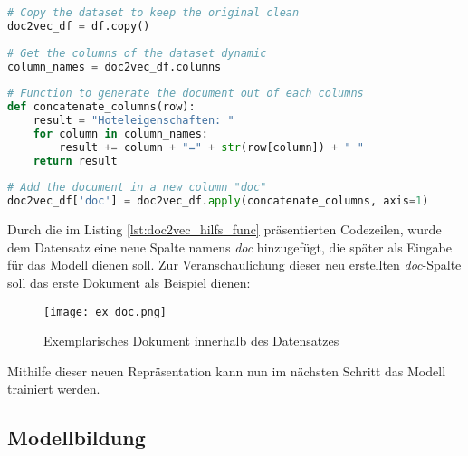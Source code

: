 \begin{lstlisting}[language=Python, label=lst:doc2vec_hilfs_func, caption=Hilfsfunktion zur Erzeugung von textbasierten Dokumenten]
# Copy the dataset to keep the original clean
doc2vec_df = df.copy()
    
# Get the columns of the dataset dynamic
column_names = doc2vec_df.columns
    
# Function to generate the document out of each columns
def concatenate_columns(row):
    result = "Hoteleigenschaften: "
    for column in column_names:
        result += column + "=" + str(row[column]) + " "
    return result
    
# Add the document in a new column "doc"
doc2vec_df['doc'] = doc2vec_df.apply(concatenate_columns, axis=1)
\end{lstlisting}

Durch die im Listing \ref{lst:doc2vec_hilfs_func} präsentierten Codezeilen, wurde dem Datensatz eine neue Spalte namens \emph{doc} hinzugefügt, die später als Eingabe für das Modell dienen soll. Zur Veranschaulichung dieser neu erstellten \emph{doc}-Spalte soll das erste Dokument als Beispiel dienen:

\begin{figure}[h]
    \centering
    \texttt{[image: ex\_doc.png]}
    \caption[Exemplarisches Dokument innerhalb des Datensatzes]{Exemplarisches Dokument innerhalb des Datensatzes}
    \label{img:ex_doc}
\end{figure}

Mithilfe dieser neuen Repräsentation kann nun im nächsten Schritt das Modell trainiert werden.

\subsection{Modellbildung}

